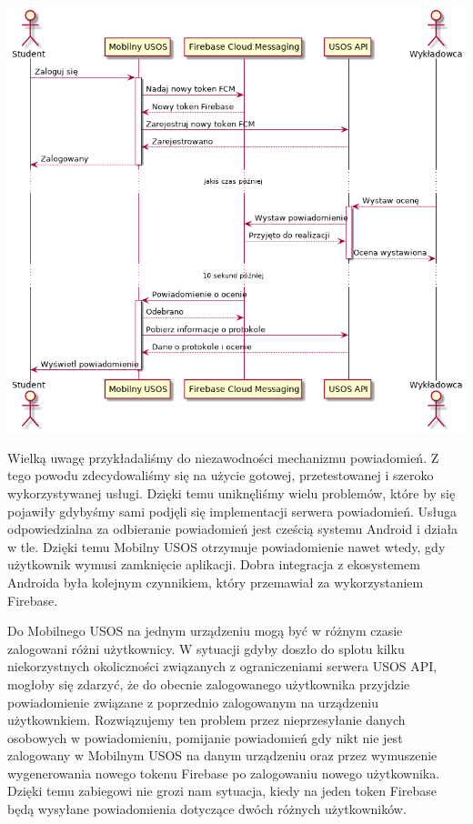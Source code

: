 \documentclass{pracamgr}
\begin{document}
\begingroup
\centering
\includegraphics[scale=0.5]{img/firebase.png}
\label{fig:firebase}
\medskip
\endgroup

Wielką uwagę przykładaliśmy do niezawodności mechanizmu powiadomień. Z tego powodu
zdecydowaliśmy się na użycie gotowej, przetestowanej i szeroko wykorzystywanej
usługi. Dzięki temu uniknęliśmy wielu problemów, które by się pojawiły gdybyśmy
sami podjęli się implementacji serwera powiadomień. Usługa odpowiedzialna za
odbieranie powiadomień jest cześcią systemu Android i działa w tle. Dzięki temu
Mobilny USOS otrzymuje powiadomienie nawet wtedy, gdy użytkownik wymusi zamknięcie
aplikacji. Dobra integracja z ekosystemem Androida była kolejnym czynnikiem, który
przemawiał za wykorzystaniem Firebase.

Do Mobilnego USOS na jednym urządzeniu mogą być w różnym czasie zalogowani różni
użytkownicy. W sytuacji gdyby doszło do splotu kilku niekorzystnych okoliczności
związanych z ograniczeniami serwera USOS API, mogłoby się zdarzyć, że do obecnie
zalogowanego użytkownika przyjdzie powiadomienie związane z poprzednio zalogowanym
na urządzeniu użytkownkiem. Rozwiązujemy ten problem przez nieprzesyłanie danych
osobowych w powiadomieniu, pomijanie powiadomień gdy nikt nie jest zalogowany w
Mobilnym USOS na danym urządzeniu oraz przez wymuszenie wygenerowania nowego tokenu
Firebase po zalogowaniu nowego użytkownika. Dzięki temu zabiegowi nie grozi nam
sytuacja, kiedy na jeden token Firebase będą wysyłane powiadomienia dotyczące dwóch
różnych użytkowników.
\end{document}
